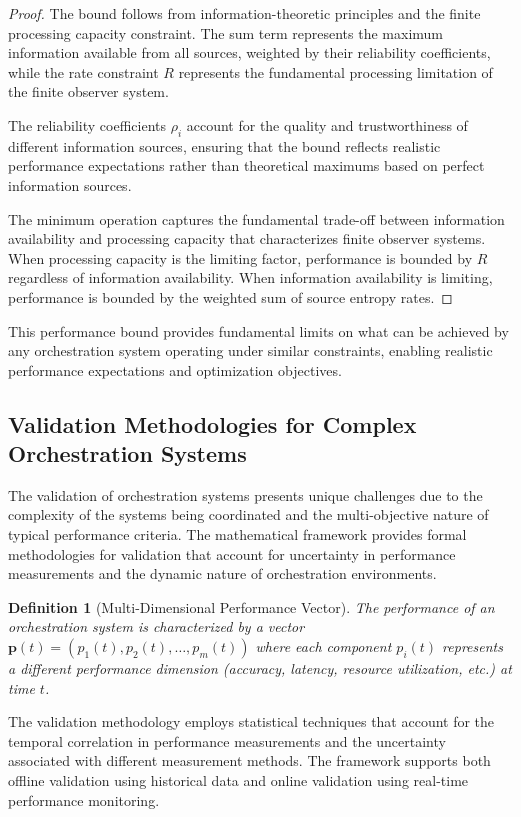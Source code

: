 \documentclass[12pt,a4paper]{article}
\newtheorem{definition}[theorem]{Definition}
\begin{document}
\begin{proof}
The bound follows from information-theoretic principles and the finite processing capacity constraint. The sum term represents the maximum information available from all sources, weighted by their reliability coefficients, while the rate constraint $R$ represents the fundamental processing limitation of the finite observer system.

The reliability coefficients $\rho_i$ account for the quality and trustworthiness of different information sources, ensuring that the bound reflects realistic performance expectations rather than theoretical maximums based on perfect information sources.

The minimum operation captures the fundamental trade-off between information availability and processing capacity that characterizes finite observer systems. When processing capacity is the limiting factor, performance is bounded by $R$ regardless of information availability. When information availability is limiting, performance is bounded by the weighted sum of source entropy rates.
\end{proof}

This performance bound provides fundamental limits on what can be achieved by any orchestration system operating under similar constraints, enabling realistic performance expectations and optimization objectives.

\subsection{Validation Methodologies for Complex Orchestration Systems}

The validation of orchestration systems presents unique challenges due to the complexity of the systems being coordinated and the multi-objective nature of typical performance criteria. The mathematical framework provides formal methodologies for validation that account for uncertainty in performance measurements and the dynamic nature of orchestration environments.

\begin{definition}[Multi-Dimensional Performance Vector]
The performance of an orchestration system is characterized by a vector $\mathbf{p}(t) = (p_1(t), p_2(t), \ldots, p_m(t))$ where each component $p_i(t)$ represents a different performance dimension (accuracy, latency, resource utilization, etc.) at time $t$.
\end{definition}

The validation methodology employs statistical techniques that account for the temporal correlation in performance measurements and the uncertainty associated with different measurement methods. The framework supports both offline validation using historical data and online validation using real-time performance monitoring.
\end{document}
